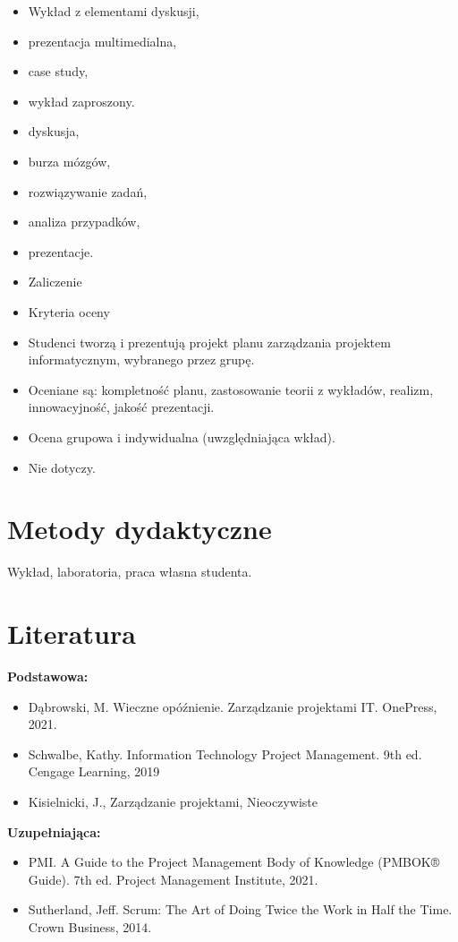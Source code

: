 \documentclass[12pt, a4paper]{article}
\begin{document}
\begin{itemize}
  \item Wykład z elementami dyskusji,
  \item prezentacja multimedialna,
  \item case study,
  \item wykład zaproszony.
  \item dyskusja,
  \item burza mózgów,
  \item rozwiązywanie zadań,
  \item analiza przypadków,
  \item prezentacje.
  \item Zaliczenie
  \item Kryteria oceny
  \item Studenci tworzą i prezentują projekt planu zarządzania projektem informatycznym, wybranego przez grupę.
  \item Oceniane są: kompletność planu, zastosowanie teorii z wykładów, realizm, innowacyjność, jakość prezentacji.
  \item Ocena grupowa i indywidualna (uwzględniająca wkład).
  \item Nie dotyczy.
\end{itemize}

\section{Metody dydaktyczne}

Wykład, laboratoria, praca własna studenta.

\section{Literatura}

\textbf{Podstawowa:}
\begin{itemize}
  \item Dąbrowski, M. Wieczne opóźnienie. Zarządzanie projektami IT. OnePress, 2021.
  \item Schwalbe, Kathy. Information Technology Project Management. 9th ed. Cengage Learning, 2019
  \item Kisielnicki, J., Zarządzanie projektami, Nieoczywiste
\end{itemize}

\textbf{Uzupełniająca:}
\begin{itemize}
  \item PMI. A Guide to the Project Management Body of Knowledge (PMBOK® Guide). 7th ed. Project Management Institute, 2021.
  \item Sutherland, Jeff. Scrum: The Art of Doing Twice the Work in Half the Time. Crown Business, 2014.
\end{itemize}
\end{document}
